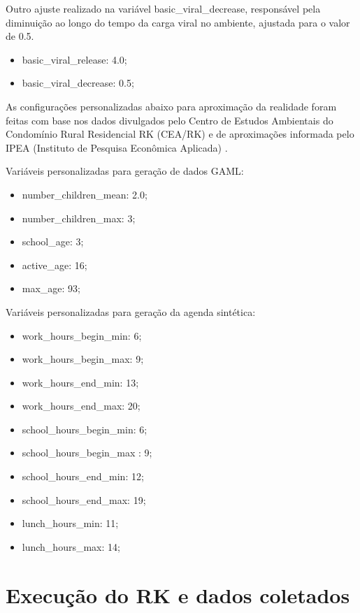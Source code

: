 Outro ajuste realizado na variável basic\_viral\_decrease, responsável pela diminuição ao longo do tempo da carga viral no ambiente, ajustada para o valor de 0.5.

\begin{itemize}
\item basic\_viral\_release: 4.0;
\item basic\_viral\_decrease: 0.5;
\end{itemize}

As configurações personalizadas abaixo para aproximação da realidade foram feitas com base nos dados divulgados pelo Centro de Estudos Ambientais do Condomínio Rural Residencial RK (CEA/RK) e de aproximações informada pelo IPEA (Instituto de Pesquisa Econômica Aplicada) \cite{IPEA:online}.

Variáveis personalizadas para geração de dados GAML:

\begin{itemize}
\item number\_children\_mean: 2.0;
\item number\_children\_max: 3;
\item school\_age: 3;
\item active\_age: 16;
\item max\_age: 93;
\end{itemize}


Variáveis personalizadas para geração da agenda sintética:

\begin{itemize}
\item work\_hours\_begin\_min: 6;
\item work\_hours\_begin\_max: 9;
\item work\_hours\_end\_min: 13; 
\item work\_hours\_end\_max: 20;
\item school\_hours\_begin\_min: 6;
\item school\_hours\_begin\_max : 9;
\item school\_hours\_end\_min: 12;
\item school\_hours\_end\_max: 19;
\item lunch\_hours\_min: 11;
\item lunch\_hours\_max: 14;
\end{itemize}


\section{Execução do RK e dados coletados}

